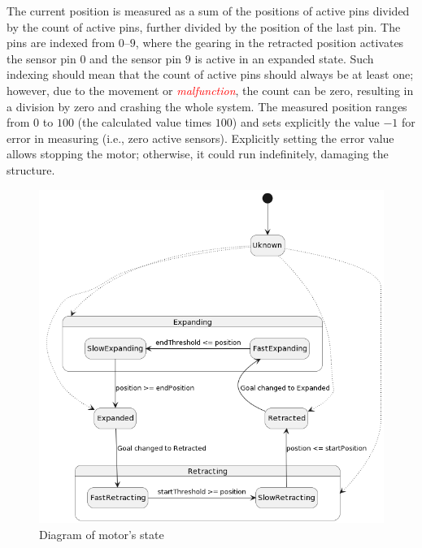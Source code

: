 \documentclass[
  digital,     %
  oneside,     %
  nosansbold,  %
  nocolorbold, %
  nolof,         %
  nolot,         %
]{fithesis4}
\newcommand{\TODO}[1]{\textcolor{red}{\textit{#1}}}
\begin{document}
{{{The current position is measured as a sum of the positions of active pins divided by the count of active pins, further divided by the position of the last pin. The pins are indexed from $\numrange{0}{9}$, where the gearing in the retracted position activates the sensor pin $0$ and the sensor pin $9$ is active in an expanded state. Such indexing should mean that the count of active pins should always be at least one; however, due to the movement or \TODO{malfunction}, the count can be zero, resulting in a division by zero and crashing the whole system. The measured position ranges from $0$ to $100$ (the calculated value times $100$) and sets explicitly the value $-1$ for error in measuring (i.e., zero active sensors). Explicitly setting the error value allows stopping the motor; otherwise, it could run indefinitely, damaging the structure. 

\begin{figure}
    \includegraphics[width=\textwidth,height=\textheight,keepaspectratio]{assets/motor-state-diagram-wip.png}
    \caption{Diagram of motor's state}
    \label{fig:motor-state}
\end{figure}

}}}
\end{document}
